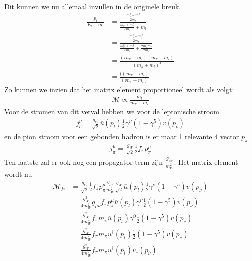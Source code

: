 \documentclass[../main.tex]{subfiles}
\begin{document}
Dit kunnen we nu allemaal invullen in de originele breuk.
\begin{equation}
    \begin{aligned}
        \label{eq:omvormen_breuk_pion_verval}
        \frac{p_l}{E_l+m_l} &= \frac{\frac{m_\pi^2-m_l^2}{2m_\pi}}{\frac{m_\pi^2 + m_l^2}{2m_\pi}+m_l}\\
                            &= \frac{\frac{m_\pi^2-m_l^2}{2m_\pi}}{\frac{m_\pi^2 + m_l^2}{2m_\pi}+\frac{2m_\pi m_l}{2m_\pi}}\\
                            &= \frac{(m_\pi+m_l)(m_\pi-m_l)}{(m_\pi+m_l)^2}\\
                            &= \frac{((m_\pi-m_l)}{(m_\pi+m_l)}
    \end{aligned}
\end{equation}
Zo kunnen we inzien dat het matrix element proportioneel wordt als volgt:
\begin{equation}
    \begin{aligned}
        \label{eq:pion_verval_matrix_2}
        \mathcal{M} \propto \frac{m_l}{m_\pi + m_l} 
    \end{aligned}
\end{equation}
Voor de stromen van dit verval hebben we voor de leptonische stroom
\begin{equation}
    \begin{aligned}
        \label{eq:pion_verval_lept_stroom}
        j_l^\nu = \frac{g_W}{\sqrt{2}} \overline u(p_l) \frac{1}{2} \gamma^\nu (1-\gamma^5)v(p_{\overline \nu})
    \end{aligned}
\end{equation}
en de pion stroom voor een gebonden hadron is er maar 1 relevante 4 vector $p_\pi$
\begin{equation}
    \begin{aligned}
        \label{eq:pion_verval_pion_stroom}
        j_\pi^\mu = \frac{g_W}{\sqrt{2}} \frac{1}{2} f_\pi p_\pi^\mu
    \end{aligned}
\end{equation}
Ten laatste zal er ook nog een propagator term zijn $ \frac{g_{\mu\nu}}{m_W^2} $. Het matrix element wordt nu
\begin{equation}
    \begin{aligned}
        \label{eq:pion_verval_matrix_3}
        \mathcal{M}_{fi} &= \frac{g_W}{\sqrt{2}} \frac{1}{2} f_\pi p_\pi^\mu \frac{g_{\mu\nu}}{m_W^2} \frac{g_W}{\sqrt{2}} \overline u(p_l) \frac{1}{2} \gamma^\nu (1-\gamma^5)v(p_{\overline \nu})\\
                         &= \frac{g_W^2}{4m_W^2} g_{\mu\nu} f_\pi p_\pi^\mu \overline u(p_l) \gamma^\nu \frac{1}{2} (1-\gamma^5)v(p_{\overline \nu})\\
                         &= \frac{g_W^2}{4m_W^2} f_\pi m_\pi \overline u(p_l) \gamma^0 \frac{1}{2} (1-\gamma^5)v(p_{\overline \nu})\\
                         &= \frac{g_W^2}{4m_W^2} f_\pi m_\pi \overline u^\dagger(p_l) \frac{1}{2} (1-\gamma^5)v(p_{\overline \nu})\\
                         &= \frac{g_W^2}{4m_W^2} f_\pi m_\pi \overline u^\dagger(p_l)v_\uparrow(p_{\overline \nu})
    \end{aligned}
\end{equation}
\end{document}
